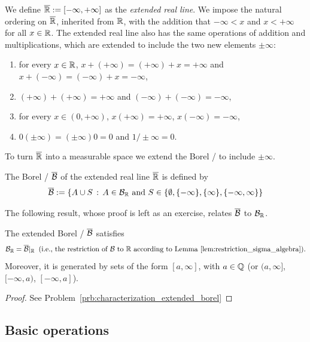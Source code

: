 We define $\overline{\mathbb R} := [-\infty,+\infty]$ as the \emph{extended real line}. We impose the natural ordering on $\overline{\mathbb R}$, inherited from $\mathbb R$, with the addition that $-\infty < x$ and $x < +\infty$ for all $x \in \mathbb R$. The extended real line also has the same operations of addition and multiplications, which are extended to include the two new elements $\pm \infty$:
\begin{enumerate}
\item for every $x\in \mathbb R$, $x + (+\infty) = (+\infty) + x = +\infty$ and $x + (-\infty) = (-\infty) + x = -\infty$,
\item $(+\infty) + (+\infty) = +\infty$ and $(-\infty) + (-\infty) = -\infty$,
\item for every $x \in (0,+\infty)$, $x (+\infty) = +\infty$,\; $x(-\infty) = -\infty$,
\item $0 (\pm \infty) = (\pm \infty) 0 = 0$ and $1/\pm \infty = 0$.
\end{enumerate}
To turn $\overline{\mathbb R}$ into a measurable space we extend the Borel \sigalg/ to include $\pm \infty$.

\begin{definition}
The Borel \sigalg/ $\overline{\mathcal B}$ of the extended real line $\overline{\mathbb R}$ is defined by
\[
	\overline{\mathcal B} := \{A \cup S \, :\, A \in \mathcal B_{\mathbb R} \text{ and } S \in \{\emptyset, \{-\infty\}, \{\infty\}, \{-\infty, \infty\}\}
\]
\end{definition}

The following result, whose proof is left as an exercise, relates $\overline{\mathcal B}$ to $\mathcal B_{\mathbb R}$.

\begin{lemma}\label{lem:characterization_extended_borel}
The extended Borel \sigalg/ $\overline{\mathcal B}$ satisfies
\[
	\mathcal B_{\mathbb R} = \overline{\mathcal B}|_{\mathbb R}\;\;\text{(i.e., the restriction of $\mathcal B$ to $\mathbb R$ according to Lemma~\ref{lem:restriction_sigma_algebra})}.
\]
Moreover, it is generated by sets of the form $[a,\infty]$, with $a \in \mathbb Q$ (or $(a,\infty]$, $[-\infty,a)$, $[-\infty,a]$).
\end{lemma}

\begin{proof}
See Problem~\ref{prb:characterization_extended_borel}
\end{proof}

\subsection{Basic operations}

